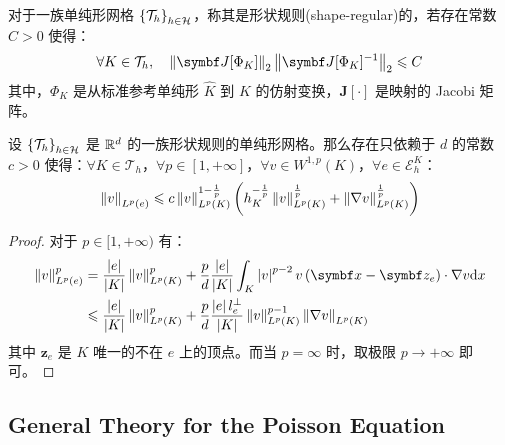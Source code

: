 \begin{definition}
	对于一族单纯形网格 \(\left\{\mathcal{T}_{h}\right\}_{h \in \mathcal{H}}\)，称其是形状规则(shape-regular)的，若存在常数 \(C > 0\) 使得：
	\begin{equation}
		\forall K \in \mathcal{T}_{h}, \quad 
		\norm{\bm J[\Phi_{K}]}_{2} \norm{\bm J[\Phi_{K}]^{-1}}_{2} \leqslant C
	\end{equation}
	其中，\(\Phi_{K}\) 是从标准参考单纯形 \(\widehat{K}\) 到 \(K\) 的仿射变换，\(\bm J[\cdot]\) 是映射的 Jacobi 矩阵。
\end{definition}

\begin{theorem}\label{thm: Multiplicative trace inequality}
	设 \(\left\{\mathcal{T}_{h}\right\}_{h \in \mathcal{H}}\) 是 \(\mathbb{R}^{d}\) 的一族形状规则的单纯形网格。那么存在只依赖于 \(d\) 的常数 \(c > 0\) 使得：\(\forall K \in \mathcal{T}_{h}\)，\(\forall p \in [1, +\infty]\)，\(\forall v \in W^{1,p}(K)\)，\(\forall e \in \mathcal{E}_{h}^{K}\)：
	\begin{equation}
		\left\lVert v\right\rVert_{L^{p}(e)} 
		\leqslant c \left\lVert v\right\rVert_{L^{p}(K)}^{1 - \frac{1}{p}} \left(h_{K}^{-\frac{1}{p}} \left\lVert v\right\rVert_{L^{p}(K)}^{\frac{1}{p}} + \left\lVert\nabla v\right\rVert_{L^{p}(K)}^{\frac{1}{p}}\right)
	\end{equation}

	\begin{proof}
		对于 \(p \in [1, +\infty)\) 有：
		\begin{align*}
			\norm{v}_{L^{p}(e)}^{p} 
			& = \frac{\abs{e}}{\abs{K}} \norm{v}_{L^{p}(K)}^{p} + \frac{p}{d} \frac{\abs{e}}{\abs{K}} \int_{K} \abs{v}^{p-2} v \left(\bm x - \bm z_{e}\right) \cdot \nabla v \d x \\
			& \leqslant \frac{\abs{e}}{\abs{K}} \norm{v}_{L^{p}(K)}^{p} + \frac{p}{d} \frac{\abs{e} l_{e}^{\perp}}{\abs{K}} \norm{v}_{L^{p}(K)}^{p-1} \norm{\nabla v}_{L^{p}(K)}
		\end{align*}
		其中 \(\bm z_{e}\) 是 \(K\) 唯一的不在 \(e\) 上的顶点。而当 \(p = \infty\) 时，取极限 \(p \to +\infty\) 即可。
	\end{proof}
\end{theorem}


\subsection{General Theory for the Poisson Equation}


